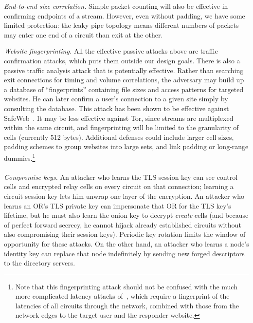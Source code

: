 \documentclass[twocolumn]{article}
\begin{document}
\emph{End-to-end size correlation.} Simple packet counting
will also be effective in confirming
endpoints of a stream. However, even without padding, we have some
limited protection: the leaky pipe topology means different numbers
of packets may enter one end of a circuit than exit at the other.

\emph{Website fingerprinting.} All the effective passive
attacks above are traffic confirmation attacks,
which puts them outside our design goals. There is also
a passive traffic analysis attack that is potentially effective.
Rather than searching exit connections for timing and volume
correlations, the adversary may build up a database of
``fingerprints'' containing file sizes and access patterns for
targeted websites. He can later confirm a user's connection to a given
site simply by consulting the database. This attack has
been shown to be effective against SafeWeb~\cite{hintz-pet02}.
It may be less effective against Tor, since
streams are multiplexed within the same circuit, and
fingerprinting will be limited to
the granularity of cells (currently 512 bytes). Additional
defenses could include
larger cell sizes, padding schemes to group websites
into large sets, and link
padding or long-range dummies.\footnote{Note that this fingerprinting
attack should not be confused with the much more complicated latency
attacks of~\cite{back01}, which require a fingerprint of the latencies
of all circuits through the network, combined with those from the
network edges to the target user and the responder website.}\\

\\
\emph{Compromise keys.} An attacker who learns the TLS session key can
see control cells and encrypted relay cells on every circuit on that
connection; learning a circuit
session key lets him unwrap one layer of the encryption. An attacker
who learns an OR's TLS private key can impersonate that OR for the TLS
key's lifetime, but he must
also learn the onion key to decrypt \emph{create} cells (and because of
perfect forward secrecy, he cannot hijack already established circuits
without also compromising their session keys). Periodic key rotation
limits the window of opportunity for these attacks. On the other hand,
an attacker who learns a node's identity key can replace that node
indefinitely by sending new forged descriptors to the directory servers.
\end{document}
